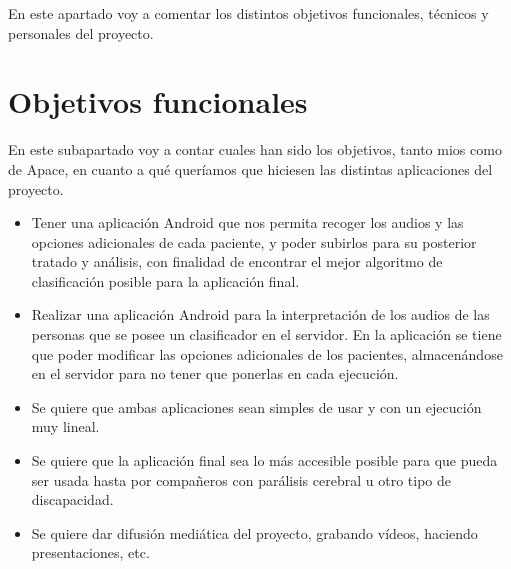 
En este apartado voy a comentar los distintos objetivos funcionales, técnicos y personales del proyecto.

\section{Objetivos funcionales}
En este subapartado voy a contar cuales han sido los objetivos, tanto mios como de Apace, en cuanto a qué queríamos que hiciesen las distintas aplicaciones del proyecto.
\begin{itemize}
	\item
	Tener una aplicación Android que nos permita recoger los audios y las opciones adicionales de cada paciente, y poder subirlos para su posterior tratado y análisis, con finalidad de encontrar el mejor algoritmo de clasificación posible para la aplicación final.
	\item
	Realizar una aplicación Android para la interpretación de los audios de las personas que se posee un clasificador en el servidor. En la aplicación se tiene que poder modificar las opciones adicionales de los pacientes, almacenándose en el servidor para no tener que ponerlas en cada ejecución.
	\item
	Se quiere que ambas aplicaciones sean simples de usar y con un ejecución muy lineal.
	\item
	Se quiere que la aplicación final sea lo más accesible posible para que pueda ser usada hasta por compañeros con parálisis cerebral u otro tipo de discapacidad.
	\item
	Se quiere dar difusión mediática del proyecto, grabando vídeos, haciendo presentaciones, etc.
\end{itemize}

